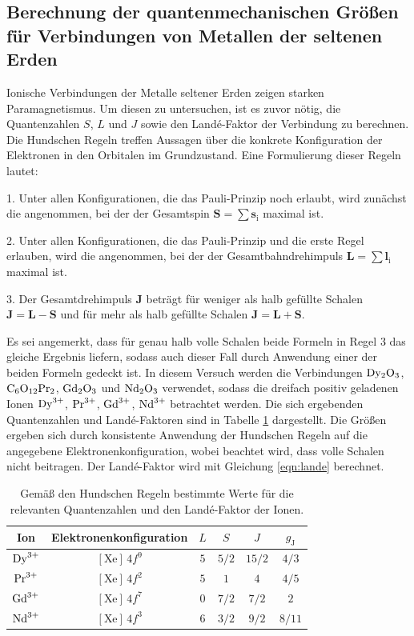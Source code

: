 \subsection{Berechnung der quantenmechanischen Größen für Verbindungen von Metallen der seltenen Erden}
\label{subsec:berechnungquantenzahlenundlande}
Ionische Verbindungen der Metalle seltener Erden zeigen starken Paramagnetismus.
Um diesen zu untersuchen, ist es zuvor nötig, die Quantenzahlen $S$, $L$ und $J$ sowie
den Landé-Faktor der Verbindung zu berechnen. Die Hundschen Regeln treffen Aussagen
über die konkrete Konfiguration der Elektronen in den Orbitalen im Grundzustand.
Eine Formulierung dieser Regeln lautet:

1. Unter allen Konfigurationen, die das Pauli-Prinzip noch erlaubt, wird zunächst die
angenommen, bei der der Gesamtspin $\symbf{S} = \sum \symbf{s}_{\text{i}}$ maximal ist.

2. Unter allen Konfigurationen, die das Pauli-Prinzip und die erste Regel erlauben, wird
die angenommen, bei der der Gesamtbahndrehimpuls $\symbf{L} = \sum \symbf{l}_{\text{i}}$
maximal ist.

3. Der Gesamtdrehimpuls $\symbf{J}$ beträgt für weniger als halb gefüllte Schalen
$\symbf{J} = \symbf{L} - \symbf{S}$ und für mehr als halb gefüllte Schalen
$\symbf{J} = \symbf{L} + \symbf{S}$.

Es sei angemerkt, dass für genau halb volle Schalen beide Formeln in Regel 3 das gleiche
Ergebnis liefern, sodass auch dieser Fall durch Anwendung einer der beiden Formeln
gedeckt ist.
In diesem Versuch werden die Verbindungen $\ce{Dy2O3}$, $\ce{C6O12Pr2}$, $\ce{Gd2O3}$ und $\ce{Nd2O3}$ verwendet, sodass die dreifach positiv geladenen
Ionen $\ce{Dy^{3+}}$, $\ce{Pr^{3+}}$, $\ce{Gd^{3+}}$, $\ce{Nd^{3+}}$ betrachtet werden.
Die sich ergebenden Quantenzahlen und Landé-Faktoren sind in Tabelle \ref{tab:lsjg}
dargestellt. Die Größen ergeben sich durch konsistente Anwendung der Hundschen Regeln
auf die angegebene Elektronenkonfiguration, wobei beachtet wird, dass volle Schalen nicht beitragen.
Der Landé-Faktor wird mit Gleichung \eqref{eqn:lande} berechnet.

\begin{table}[H]
\begin{center}
\caption{Gemäß den Hundschen Regeln bestimmte Werte für die relevanten Quantenzahlen und den Landé-Faktor der Ionen.}
\label{tab:lsjg}
\begin{tabular}{cccccc}
\toprule
Ion & Elektronenkonfiguration & $L$ & $S$ & $J$ & $g_{\text{J}}$\\
\midrule
$\ce{Dy^{3+}}$ & $[\text{Xe}] \, 4f^9$ & $5$ & $5/2$ & $15/2$ & $4/3$  \\
$\ce{Pr^{3+}}$ & $[\text{Xe}] \, 4f^2$ & $5$ & $1$   & $4$    & $4/5$  \\
$\ce{Gd^{3+}}$ & $[\text{Xe}] \, 4f^7$ & $0$ & $7/2$ & $7/2$  & $2$    \\
$\ce{Nd^{3+}}$ & $[\text{Xe}] \, 4f^3$ & $6$ & $3/2$ & $9/2$  & $8/11$ \\
\bottomrule
\end{tabular}
\end{center}
\end{table}

